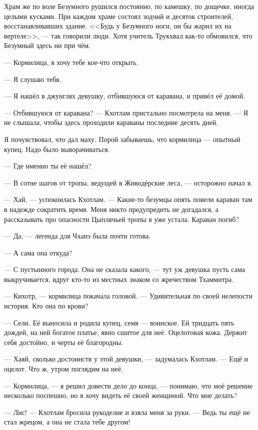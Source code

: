 Храм же по воле Безумного рушился постоянно, по камешку, по дощечке, иногда целыми кусками.
При каждом храме состоял зодчий и десяток строителей, восстанавливавших здание.
<<Будь у Безумного ноги, он бы жарил их на вертеле>>, --- так говорили люди.
Хотя учитель Трукхвал как-то обмовился, что Безумный здесь ни при чём.

--- Кормилица, я хочу тебе кое-что открыть.

--- Я слушаю тебя.

--- Я нашёл в джунглях девушку, отбившуюся от каравана, и привёл её домой.

--- Отбившуюся от каравана? --- Кхотлам пристально посмотрела на меня.
--- Я не слышала, чтобы здесь проходили караваны последние десять дней.

Я почувствовал, что дал маху.
Порой забываешь, что кормилица --- опытный купец.
Надо было выворачиваться.

--- Где именно ты её нашёл?

--- В сотне шагов от тропы, ведущей в Живодёрские леса, --- осторожно начал я.

--- Хай, --- успокоилась Кхотлам.
--- Какие-то безумцы опять повели караван там в надежде сократить время.
Меня никто предупредить не догадался, а рассказывать про опасности Цыплячьей тропы я уже устала.
Караван погиб?

--- Да, --- легенда для Чханэ была почти готова.

--- А сама она откуда?

--- С пустынного города.
Она не сказала какого, --- тут уж девушка пусть сама выкручивается, вдруг кто-то из местных знаком со жречеством Тхаммитра.

--- Кихотр, --- кормилица покачала головой.
--- Удивительная по своей нелепости история.
Кто она по крови?

--- Сели.
Её выносила и родила купец, семя --- воинское.
Ей тридцать пять дождей, на ней богатое платье, явно сшитое для неё.
Оцелотовая кожа.
Держит себя достойно, и черты её благородны.

--- Хаяй, сколько достоинств у этой девушки, --- задумалась Кхотлам.
--- Ещё и оцелот.
Что ж, утром поглядим на неё.

--- Кормилица, --- я решил довести дело до конца, --- понимаю, что моё решение несколько поспешно, но я хочу видеть её своей женщиной.
Что мне делать?

--- Лис! --- Кхотлам бросила рукоделие и взяла меня за руки.
--- Ведь ты ещё не стал жрецом, а она не стала тебе другом!

